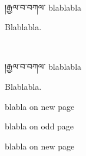 \documentclass{upecha}
\begin{document}

\cleardoublepage

\makeatletter
{}
\makeatother


\oddright[0]{{\bispage}}
\evenright[0]{{\bispage}}
\oddleft[0]{}

\ 

\vskip 2mm
།རྒྱལ་བ་བཀལ་ blablabla

Blablabla.

\newpage

\ 

\vskip 2mm
།རྒྱལ་བ་བཀལ་ blablabla

Blablabla.

\begin{titleanypage}
\end{titleanypage}

blabla on new page

\newpage

blabla on odd page

\begin{titlepage}
\end{titlepage}

blabla on new page
\end{document}
